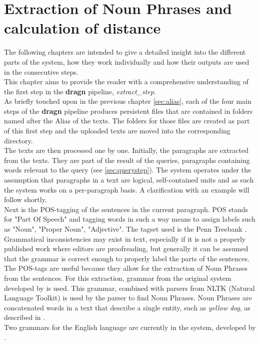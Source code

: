 \section{Extraction of Noun Phrases and calculation of distance}
\label{sec:extract}
The following chapters are intended to give a detailed insight into the different parts of the system, how they work individually and how their outputs are used in the consecutive steps.\\
This chapter aims to provide the reader with a comprehensive understanding of the first step in the \textbf{dragn} pipeline, \textit{extract\_step}.\\
As briefly touched upon in the previous chapter \ref{sec:alias}, each of the four main steps of the \textbf{dragn} pipeline produces persistent files that are contained in folders named after the Alias of the texts. The folders for those files are created as part of this first step and the uploaded texts are moved into the corresponding directory.\\
The texts are then processed one by one. Initially, the paragraphs are extracted from the texts. They are part of the result of the queries, paragraphs containing words relevant to the query (see \ref{sec:querystep}). The system operates under the assumption that paragraphs in a text are logical, self-contained units and as such the system works on a per-paragraph basis. A clarification with an example will follow shortly.\\
Next is the POS-tagging of the sentences in the current paragraph. POS stands for "Part Of Speech" and tagging words in such a way means to assign labels such as "Noun", "Proper Noun", "Adjective". The tagset used is the Penn Treebank \cite{marcus1993building}. Grammatical inconsistencies may exist in text, especially if it is not a properly published work where editors are proofreading, but generally it can be assumed that the grammar is correct enough to properly label the parts of the sentences.\\
The POS-tags are useful because they allow for the extraction of Noun Phrases from the sentences. For this extraction, grammar from the original system developed by \cite{novavcek2014skimmr} is used. This grammar, combined with parsers from NLTK (Natural Language Toolkit) is used by the parser to find Noun Phrases. Noun Phrases are concatenated words in a text that describe a single entity, such as \textit{yellow dog}, as described in \cite{abney1987english}.\\
Two grammars for the English language are currently in the system, developed by \cite{novavcek2014skimmr}.
